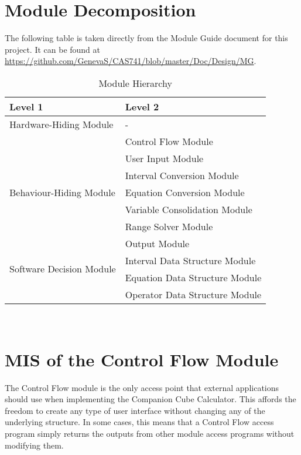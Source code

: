 \documentclass[12pt, titlepage]{article}
\begin{document}
\newpage

\section{Module Decomposition}
The following table is taken directly from the Module Guide document for this 
project. It can be found at 
\href{https://github.com/GenevaS/CAS741/blob/master/Doc/Design/MG}{https://github.com/GenevaS/CAS741/blob/master/Doc/Design/MG}.

\begin{table}[h!]
	\centering
	\begin{tabular}{p{} p{}}
		\toprule
		\textbf{Level 1} & \textbf{Level 2}\\
		\midrule
		
		{Hardware-Hiding Module} & - \\
		\midrule
		
		\multirow{7}{0.29\textwidth}{Behaviour-Hiding Module} & Control Flow 
		Module \\
		& User Input Module \\
		& Interval Conversion Module \\
		& Equation Conversion Module \\
		& Variable Consolidation Module \\
		& Range Solver Module \\
		& Output Module \\
		\midrule
		
		\multirow{2}{0.29\textwidth}{Software Decision Module} & Interval Data 
		Structure Module \\
		& Equation Data Structure Module \\
		& Operator Data Structure Module \\
		\bottomrule
		
	\end{tabular}
	\caption{Module Hierarchy}
	\label{TblMH}
\end{table}

~\newpage

\section{MIS of the Control Flow Module} 
\label{Module_controlflow}
The Control Flow module is the only access point that external applications 
should use when implementing the Companion Cube Calculator. This affords the 
freedom to create any type of user interface without changing any of the 
underlying structure. In some cases, this means that a Control Flow access 
program simply returns the outputs from other module access programs without 
modifying them.
\end{document}
